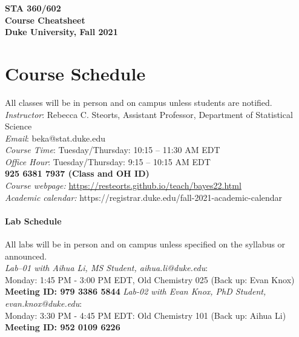 \documentclass[11pt]{article}
\date{}
\begin{document}
\begin{center}
{\Large\bf STA 360/602\\ Course Cheatsheet} \\

{\Large\bf Duke University, Fall 2021} \\
\end{center}


\section{Course Schedule}
All classes will be in person and on campus unless students are notified. 
\emph{Instructor}: Rebecca C. Steorts,  Assistant Professor,  Department of Statistical Science\\
\emph{Email}: beka@stat.duke.edu\\
\emph{Course Time}: Tuesday/Thursday: 10:15 -- 11:30 AM EDT \\
\emph{Office Hour}: Tuesday/Thursday: 9:15 -- 10:15 AM EDT \\
\textbf{925 6381 7937 (Class and OH ID)}\\
\emph{Course webpage:} \url{https://resteorts.github.io/teach/bayes22.html} \\
\emph{Academic calendar:} https://registrar.duke.edu/fall-2021-academic-calendar


\paragraph{Lab Schedule}
All labs will be in person and on campus unless specified on the syllabus or announced. \\
\emph{Lab--01 with Aihua Li, MS Student, aihua.li@duke.edu}: \\Monday: 1:45 PM - 3:00 PM EDT, Old Chemistry 025 (Back up: Evan Knox) \\
\textbf{Meeting ID: 979 3386 5844}
\emph{Lab-02 with Evan Knox, PhD Student, evan.knox@duke.edu}: \\Monday: 3:30 PM - 4:45 PM EDT: Old Chemistry 101 (Back up: Aihua Li) \\
\textbf{Meeting ID: 952 0109 6226}\\
\end{document}
